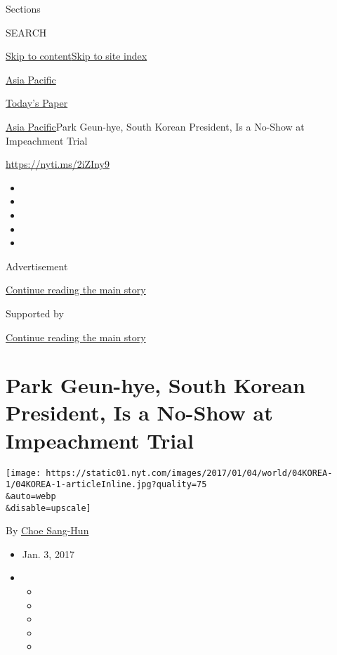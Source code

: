 Sections

SEARCH

\protect\hyperlink{site-content}{Skip to
content}\protect\hyperlink{site-index}{Skip to site index}

\href{https://www.nytimes.com/section/world/asia}{Asia Pacific}

\href{https://myaccount.nytimes.com/auth/login?response_type=cookie\&client_id=vi}{}

\href{https://www.nytimes.com/section/todayspaper}{Today's Paper}

\href{/section/world/asia}{Asia Pacific}\textbar{}Park Geun-hye, South
Korean President, Is a No-Show at Impeachment Trial

\url{https://nyti.ms/2iZIny9}

\begin{itemize}
\item
\item
\item
\item
\item
\end{itemize}

Advertisement

\protect\hyperlink{after-top}{Continue reading the main story}

Supported by

\protect\hyperlink{after-sponsor}{Continue reading the main story}

\hypertarget{park-geun-hye-south-korean-president-is-a-no-show-at-impeachment-trial}{%
\section{Park Geun-hye, South Korean President, Is a No-Show at
Impeachment
Trial}\label{park-geun-hye-south-korean-president-is-a-no-show-at-impeachment-trial}}

\texttt{[image: https://static01.nyt.com/images/2017/01/04/world/04KOREA-1/04KOREA-1-articleInline.jpg?quality=75\\\&auto=webp\\\&disable=upscale]}

By \href{http://www.nytimes.com/by/choe-sang-hun}{Choe Sang-Hun}

\begin{itemize}
\item
  Jan. 3, 2017
\item
  \begin{itemize}
  \item
  \item
  \item
  \item
  \item
  \end{itemize}
\end{itemize}


